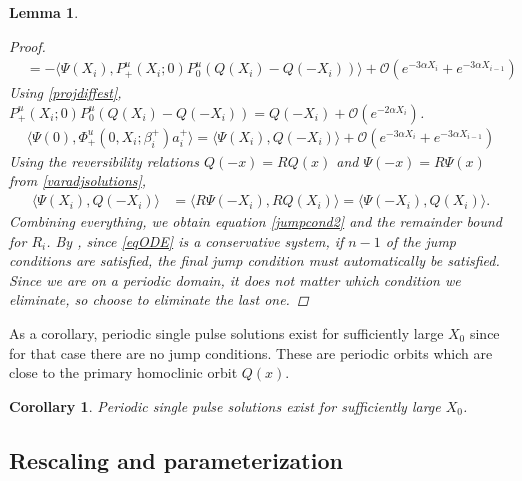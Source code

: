 \documentclass[10pt,reqno]{amsart}
\theoremstyle{plain}
\newtheorem{corollary}[theorem]{Corollary}
\newtheorem{lemma}[theorem]{Lemma}
\theoremstyle{definition}
\theoremstyle{remark}
\numberwithin{theorem}{section}
\numberwithin{equation}{section}
\begin{document}
\begin{lemma}
\begin{proof}
\begin{align*}
&= -\langle \Psi(X_i), P^u_+(X_i; 0) P^u_0 \left( Q(X_i) - Q(-X_i) \right) \rangle + \mathcal{O}( e^{-3 \alpha X_i} + e^{-3\alpha X_{i-1}})
\end{align*}
Using \cref{projdiffest}, $P^u_+(X_i; 0) P^u_0 ( Q(X_i) - Q(-X_i)) = Q(-X_i) + \mathcal{O}(e^{-2\alpha X_i})$.
\begin{align*}
\langle \Psi(0), \Phi^u_+(0, X_i; \beta_i^+) a_i^+ \rangle = 
\langle \Psi(X_i), Q(-X_i) \rangle + \mathcal{O}( e^{-3 \alpha X_i} + e^{-3\alpha X_{i-1}})
\end{align*}
Using the reversibility relations $Q(-x) = RQ(x)$ and $\Psi(-x) = R\Psi(x)$ from \cref{varadjsolutions},
\begin{align*}
\langle \Psi(X_i), Q(-X_i) \rangle 
&= \langle R\Psi(-X_i), R Q(X_i) \rangle 
= \langle \Psi(-X_i), Q(X_i) \rangle.
\end{align*}
Combining everything, we obtain equation \cref{jumpcond2} and the remainder bound for $R_i$. By \cite[p. 2093]{SandstedeStrut}, since \cref{eqODE} is a conservative system, if $n-1$ of the jump conditions are satisfied, the final jump condition must automatically be satisfied. Since we are on a periodic domain, it does not matter which condition we eliminate, so choose to eliminate the last one. 
\end{proof}
\end{lemma}

As a corollary, periodic single pulse solutions exist for sufficiently large $X_0$ since for that case there are no jump conditions. These are periodic orbits which are close to the primary homoclinic orbit $Q(x)$.

\begin{corollary}\label{corr:1pexists}
Periodic single pulse solutions exist for sufficiently large $X_0$.
\end{corollary}

\subsection{Rescaling and parameterization}
\end{document}
